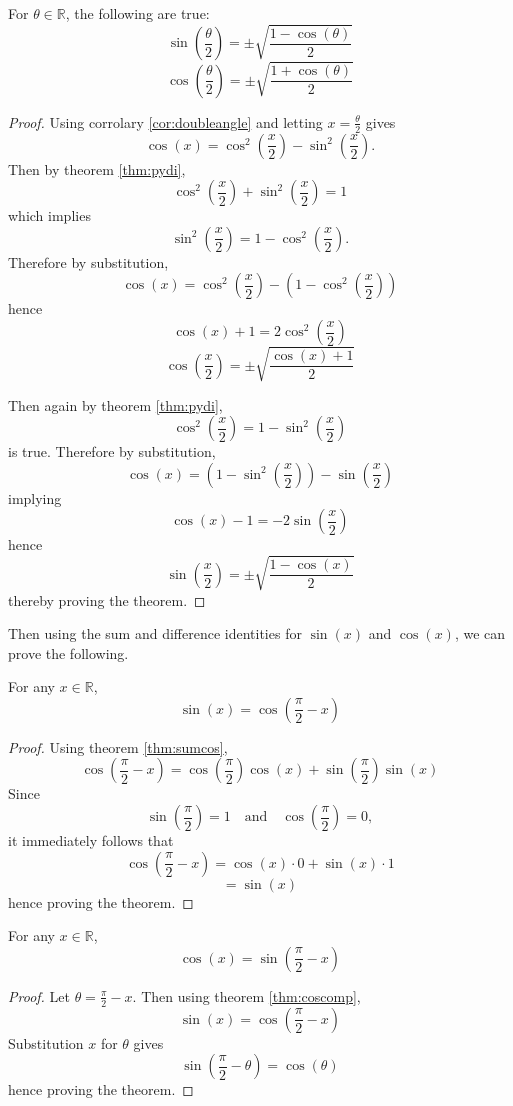 \documentclass[11pt]{article}
\numberwithin{lemma}{section}
\numberwithin{equation}{section}
\numberwithin{define}{section}
\numberwithin{prop}{section}
\numberwithin{figure}{section}
\numberwithin{theorem}{section}
\numberwithin{cor}{section}
\newcounter{ex}[section]
\numberwithin{ex}{section}
\def\real{\mathbb{R}}
\def\paren#1{\left(#1\right)}
\def\jand{\quad\text{and}\quad}
\begin{document}
\begin{cor}
	For $\theta\in\real$, the following are true:
	$$\sin\paren{\frac{\theta}{2}}=\pm\sqrt{\frac{1-\cos(\theta)}{2}}$$
	$$\cos\paren{\frac{\theta}{2}}=\pm\sqrt{\frac{1+\cos(\theta)}{2}}$$
\end{cor}
\begin{proof}
	Using corrolary \eqref{cor:doubleangle} and letting $x=\frac{\theta}{2}$ gives
	$$\cos(x)=\cos^2\paren{\frac{x}{2}}-\sin^2\paren{\frac{x}{2}}.$$
	Then by theorem \eqref{thm:pydi},
	$$\cos^2(\frac{x}{2})+\sin^2(\frac{x}{2})=1$$
	which implies
	$$\sin^2\paren{\frac{x}{2}}=1-\cos^2\paren{\frac{x}{2}}.$$
	Therefore by substitution,
	$$\cos(x)=\cos^2\paren{\frac{x}{2}}-\paren{1-\cos^2\paren{\frac{x}{2}}}$$
	hence
	$$\cos(x)+1=2\cos^2\paren{\frac{x}{2}}$$
	$$\cos\paren{\frac{x}{2}}=\pm\sqrt{\frac{\cos(x)+1}{2}}$$

	Then again by theorem \eqref{thm:pydi},
	$$\cos^2\paren{\frac{x}{2}}=1-\sin^2\paren{\frac{x}{2}}$$
	is true.
	Therefore by substitution,
	$$\cos(x)=\paren{1-\sin^2\paren{\frac{x}{2}}}-\sin\paren{\frac{x}{2}}$$
	implying
	$$\cos(x)-1=-2\sin\paren{\frac{x}{2}}$$
	hence
	$$\sin\paren{\frac{x}{2}}=\pm\sqrt{\frac{1-\cos(x)}{2}}$$
	thereby proving the theorem.
\end{proof}

Then using the sum and difference identities for $\sin(x)$ and $\cos(x)$, we can prove the following.

\begin{theorem}
For any $x\in\real$,
$$\sin(x)=\cos\paren{\frac{\pi}{2}-x}$$
\label{thm:coscomp}
\end{theorem}
\begin{proof}
	Using theorem \eqref{thm:sumcos},
	$$\cos\paren{\frac{\pi}{2}-x}=\cos\paren{\frac{\pi}{2}}\cos(x)+\sin\paren{\frac{\pi}{2}}\sin(x)$$
	Since
	$$\sin\paren{\frac{\pi}{2}}=1 \jand \cos\paren{\frac{\pi}{2}}=0,$$
	it immediately follows that
	$$\cos\paren{\frac{\pi}{2}-x}=\cos(x)\cdot 0 + \sin(x)\cdot 1$$
	$$=\sin(x)$$
	hence proving the theorem.
\end{proof}

\begin{cor}
	For any $x\in\real$,
	$$\cos(x)=\sin\paren{\frac{\pi}{2}-x}$$
	\label{cor:sincomp}
\end{cor}
\begin{proof}
	Let $\theta=\frac{\pi}{2}-x$. Then using theorem \eqref{thm:coscomp},
	$$\sin(x)=\cos\paren{\frac{\pi}{2}-x}$$
	Substitution $x$ for $\theta$ gives
	$$\sin\paren{\frac{\pi}{2}-\theta}=\cos(\theta)$$
	hence proving the theorem.
\end{proof}
\end{document}
